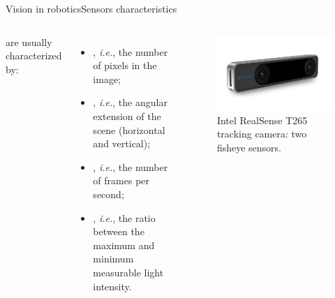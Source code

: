 \begin{frame}{Vision in robotics}{Sensors characteristics}
	\begin{columns}
		 are usually characterized by:
		\begin{itemize}
			\item {}, \emph{i.e.}, the number of pixels in the image;
			\item {}, \emph{i.e.}, the angular extension of the scene (horizontal and vertical);
			\item {}, \emph{i.e.}, the number of frames per second;
			\item {}, \emph{i.e.}, the ratio between the maximum and minimum measurable light intensity.
		\end{itemize}

		\begin{figure}
			\centering
			\includegraphics[width=\textwidth]{t265}
			\caption{Intel RealSense T265 tracking camera: two fisheye sensors.}
			\label{fig:t265}
		\end{figure}
	\end{columns}
\end{frame}
